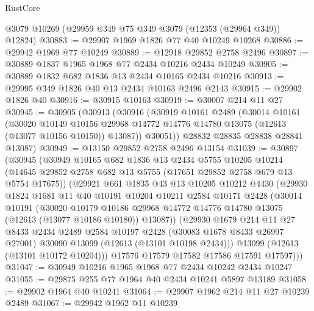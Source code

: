 \begin{lexlean}{RustCore}
\begin{coremodule}
    @3079
    @10269
    (@29959 @349 @75 @349 @3079 (@12353 (@29964 @349)) @12824)
@30883 := @29907 @1969 @1826 @77 @40 @10249 @10268
@30886 := @29942 @1969 @77 @10249
@30889 := @12918 @29852 @2758 @2496
@30897 := @30889 @1837 @1965 @1968 @77 @2434 @10216 @2434 @10249
@30905 := @30889 @1832 @682 @1836 @13 @2434 @10165 @2434 @10216
@30913 := @29995 @349 @1826 @40 @13 @2434 @10163 @2496 @2143
@30915 := @29902 @1826 @40
@30916 := @30915 @10163
@30919 := @30007 @214 @11 @27
@30945 := @30905
    (@30913
      (@30916
        (@30919
          @10161
          @2489
          (@30014
            @10161
            (@30020
              @10149
              @10156
              @29968
              @14772
              @14776
              @14780
              @13075
              (@12613 (@13077 @10156 @10150))
              @13087))
          @30051))
      @28832
      @28835
      @28838
      @28841
      @13087)
@30949 := @13150 @29852 @2758 @2496 @13154
@31039 := @30897
    (@30945
      (@30949
        @10165
        @682
        @1836
        @13
        @2434
        @5755
        @10205
        @10214
        (@14645 @29852 @2758 @682 @13 @5755 (@17651 @29852 @2758 @679 @13 @5754 @17675))
        (@29921
          @661
          @1835
          @43
          @13
          @10205
          @10212
          @4430
          (@29930
            @1824
            @1681
            @11
            @40
            @10191
            @10204
            @10211
            @2584
            @10171
            @2428
            (@30014
              @10191
              (@30020
                @10179
                @10186
                @29968
                @14772
                @14776
                @14780
                @13075
                (@12613 (@13077 @10186 @10180))
                @13087))
            (@29930
              @1679
              @214
              @11
              @27
              @8433
              @2434
              @2489
              @2584
              @10197
              @2428
              (@30083 @1678 @8433 @26997 @27001)
              @30090
              @13099
              (@12613 (@13101 @10198 @2434)))
            @13099
            (@12613 (@13101 @10172 @10204)))
          @17576
          @17579
          @17582
          @17586
          @17591
          @17597)))
@31047 := @30949 @10216 @1965 @1968 @77 @2434 @10242 @2434 @10247
@31055 := @29875 @255 @77 @1964 @40 @2434 @10241 @5897 @13189
@31058 := @29902 @1964 @40 @10241
@31064 := @29907 @1962 @214 @11 @27 @10239 @2489
@31067 := @29942 @1962 @11 @10239

\end{coremodule}
\end{lexlean}
